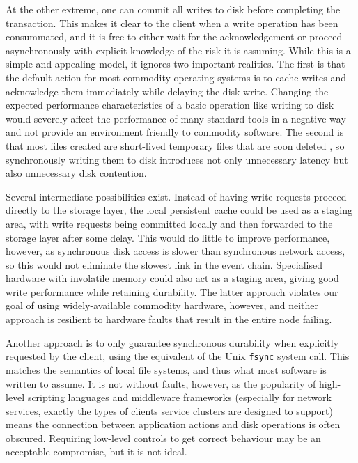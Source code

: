 At the other extreme, one can commit all writes to disk before completing the transaction. This makes it clear to the client when a write operation has been consummated, and it is free to either wait for the acknowledgement or proceed asynchronously with explicit knowledge of the risk it is assuming. While this is a simple and appealing model, it ignores two important realities. The first is that the default action for most commodity operating systems is to cache writes and acknowledge them immediately while delaying the disk write. Changing the expected performance characteristics of a basic operation like writing to disk would severely affect the performance of many standard tools in a negative way and not provide an environment friendly to commodity software. The second is that most files created are short-lived temporary files that are soon deleted \cite{ousterhout}, so synchronously writing them to disk introduces not only unnecessary latency but also unnecessary disk contention.

Several intermediate possibilities exist. Instead of having write requests proceed directly to the storage layer, the local persistent cache could be used as a staging area, with write requests being committed locally and then forwarded to the storage layer after some delay. This would do little to improve performance, however, as synchronous disk access is slower than synchronous network access, so this would not eliminate the slowest link in the event chain. Specialised hardware with involatile memory could also act as a staging area, giving good write performance while retaining durability. The latter approach violates our goal of using widely-available commodity hardware, however, and neither approach is resilient to hardware faults that result in the entire node failing.

Another approach is to only guarantee synchronous durability when explicitly requested by the client, using the equivalent of the Unix \texttt{fsync} system call. This matches the semantics of local file systems, and thus what most software is written to assume. It is not without faults, however, as the popularity of high-level scripting languages and middleware frameworks (especially for network services, exactly the types of clients service clusters are designed to support) means the connection between application actions and disk operations is often obscured. Requiring low-level controls to get correct behaviour may be an acceptable compromise, but it is not ideal.

